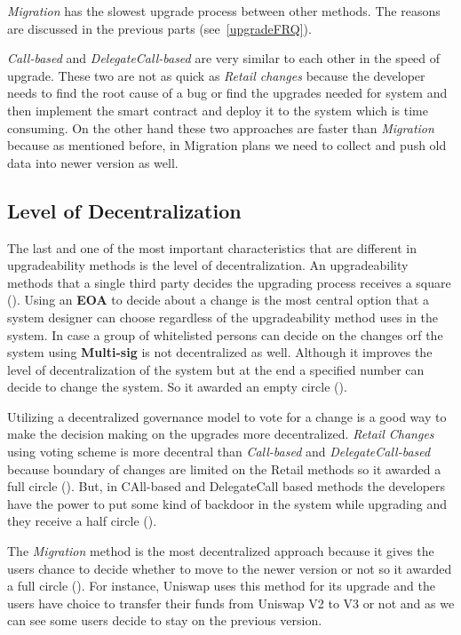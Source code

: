 \textit{Migration} has the slowest upgrade process between other methods. The reasons are discussed in the previous parts (see~\ref{upgradeFRQ}).

\textit{Call-based} and \textit{DelegateCall-based} are very similar to each other in the speed of upgrade. These two are not as quick as \textit{Retail changes} because the developer needs to find the root cause of a bug or find the upgrades needed for system and then implement the smart contract and deploy it to the system which is time consuming.
On the other hand these two approaches are faster than \textit{Migration} because as mentioned before, in Migration plans we need to collect and push old data into newer version as well.  

 \subsection{Level of Decentralization}

The last and one of the most important characteristics that are different in upgradeability methods is the level of decentralization. An upgradeability methods that a single third party decides the upgrading process receives a square (\XBox). 
Using an \textbf{EOA} to decide about a change is the most central option that a system designer can choose regardless of the upgradeability method uses in the system. 
In case a group of whitelisted persons can decide on the changes orf the system using \textbf{Multi-sig} is not decentralized as well. Although it improves the level of decentralization of the system but at the end a specified number can decide to change the system. So it awarded an empty circle (\Circle).

Utilizing a decentralized governance model to vote for a change is a good way to make the decision making on the upgrades more decentralized. \textit{Retail Changes} using voting scheme is more decentral than \textit{Call-based} and \textit{DelegateCall-based} because boundary of changes are limited on the Retail methods so it awarded a full circle (\CIRCLE). But, in CAll-based and DelegateCall based methods the developers have the power to put some kind of backdoor in the system while upgrading and they receive a half circle (\LEFTcircle). 

The \textit{Migration} method is the most decentralized approach because it gives the users chance to decide whether to move to the newer version or not so it awarded a full circle (\CIRCLE). For instance, Uniswap uses this method for its upgrade and the users have choice to transfer their funds from Uniswap V2 to V3 or not and as we can see some users decide to stay on the previous version.

